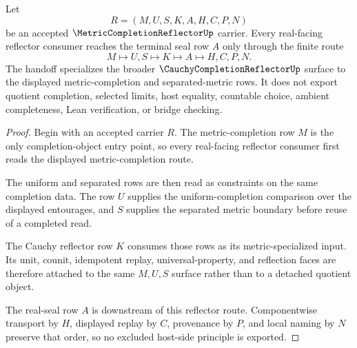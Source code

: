\begin{theorem}
\label{thm:metric-completion-reflector-real-seal-handoff}
Let
$$
R=(M,U,S,K,A,H,C,P,N)
$$
be an accepted $\MetricCompletionReflectorUp$ carrier. Every real-facing reflector consumer reaches the terminal seal row $A$ only through the finite route
$$
M\longmapsto U,S\longmapsto K\longmapsto A\longmapsto H,C,P,N .
$$
The handoff specializes the broader $\CauchyCompletionReflectorUp$ surface to the displayed metric-completion and separated-metric rows. It does not export quotient completion, selected limits, host equality, countable choice, ambient completeness, Lean verification, or bridge checking.
\end{theorem}
\begin{proof}
Begin with an accepted carrier $R$. The metric-completion row $M$ is the only completion-object entry point, so every real-facing reflector consumer first reads the displayed metric-completion route.

The uniform and separated rows are then read as constraints on the same completion data. The row $U$ supplies the uniform-completion comparison over the displayed entourages, and $S$ supplies the separated metric boundary before reuse of a completed read.

The Cauchy reflector row $K$ consumes those rows as its metric-specialized input. Its unit, counit, idempotent replay, universal-property, and reflection faces are therefore attached to the same $M,U,S$ surface rather than to a detached quotient object.

The real-seal row $A$ is downstream of this reflector route. Componentwise transport by $H$, displayed replay by $C$, provenance by $P$, and local naming by $N$ preserve that order, so no excluded host-side principle is exported.
\end{proof}


